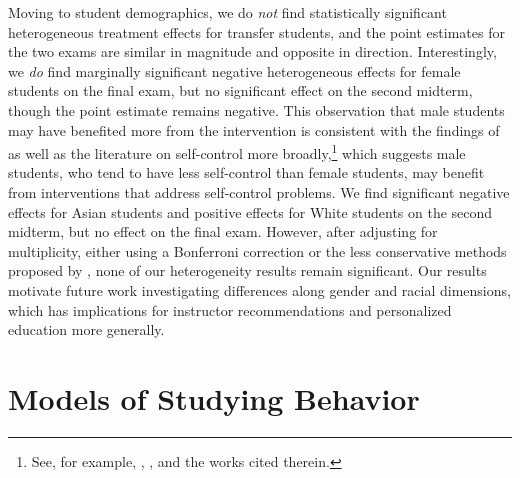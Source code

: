 \documentclass[12pt]{article}
\begin{document}
Moving to student demographics, we do \textit{not} find statistically significant heterogeneous treatment effects for transfer students, and the point estimates for the two exams are similar in magnitude and opposite in direction. Interestingly, we \textit{do} find marginally significant negative heterogeneous effects for female students on the final exam, but no significant effect on the second midterm, though the point estimate remains negative. This observation that male students may have benefited more from the intervention is consistent with the findings of \textcite{cgpr2020} as well as the literature on self-control more broadly,\footnote{See, for example, \textcite{ds2006}, \textcite{dsmpzd2015}, and the works cited therein.} which suggests male students, who tend to have less self-control than female students, may benefit from interventions that address self-control problems. We find significant negative effects for Asian students and positive effects for White students on the second midterm, but no effect on the final exam. However, after adjusting for multiplicity, either using a Bonferroni correction or the less conservative methods proposed by \textcite{lsx2019}, none of our heterogeneity results remain significant. Our results motivate future work investigating differences along gender and racial dimensions, which has implications for instructor recommendations and personalized education more generally.

\section{Models of Studying Behavior} \label{models}
\end{document}
